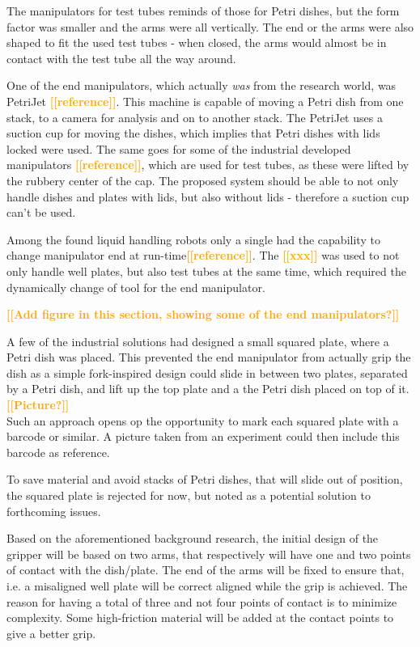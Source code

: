 \documentclass{sigchi}
\newcommand{\todo}[1]{\textsf{\textbf{\textcolor{Orange}{[[#1]]}}}}
\begin{document}
	The manipulators for test tubes reminds of those for Petri dishes, but the form factor was smaller and the arms were all vertically. The end or the arms were also shaped to fit the used test tubes - when closed, the arms would almost be in contact with the test tube all the way around.
	
	One of the end manipulators, which actually \textit{was} from the research world, was PetriJet \todo{reference}. This machine is capable of moving a Petri dish from one stack, to a camera for analysis and on to another stack. The PetriJet uses a suction cup for moving the dishes, which implies that Petri dishes with lids locked were used. The same goes for some of the industrial developed manipulators \todo{reference}, which are used for test tubes, as these were lifted by the rubbery center of the cap. The proposed system should be able to not only handle dishes and plates with lids, but also without lids - therefore a suction cup can't be used.
	
	Among the found liquid handling robots only a single had the capability to change manipulator end at run-time\todo{reference}. The \todo{xxx} was used to not only handle well plates, but also test tubes at the same time, which required the dynamically change of tool for the end manipulator.
	
	\todo{Add figure in this section, showing some of the end manipulators?}
	
	A few of the industrial solutions had designed a small squared plate, where a Petri dish was placed. This prevented the end manipulator from actually grip the dish as a simple fork-inspired design could slide in between two plates, separated by a Petri dish, and lift up the top plate and a the Petri dish placed on top of it. \todo{Picture?}\\
	Such an approach opens op the opportunity to mark each squared plate with a barcode or similar. A picture taken from an experiment could then include this barcode as reference.
	
	To save material and avoid stacks of Petri dishes, that will slide out of position, the squared plate is rejected for now, but noted as a potential solution to forthcoming issues.
		
	Based on the aforementioned background research, the initial design of the gripper will be based on two arms, that respectively will have one and two points of contact with the dish/plate. The end of the arms will be fixed to ensure that, i.e. a misaligned well plate will be correct aligned while the grip is achieved. The reason for having a total of three and not four points of contact is to minimize complexity. Some high-friction material will be added at the contact points to give a better grip.
	
\end{document}
